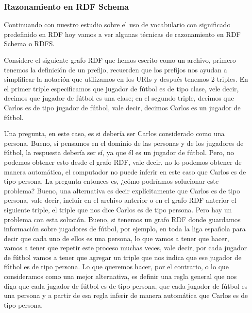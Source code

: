 \subsubsection{Razonamiento en RDF Schema}

Continuando con nuestro estudio sobre el uso de vocabulario con significado predefinido en RDF hoy vamos a ver algunas técnicas de razonamiento en RDF Schema o RDFS.

Considere el siguiente grafo RDF que hemos escrito como un archivo, primero tenemos la definición de un prefijo, recuerden que los prefijos nos ayudan a simplificar la notación que utilizamos en los URIs y después tenemos 2 triples. En el primer triple especificamos que jugador de fútbol es de tipo clase, vele decir, decimos que jugador de fútbol es una clase; en el segundo triple, decimos que Carlos es de tipo jugador de fútbol, vale decir, decimos Carlos es un jugador de fútbol.

Una pregunta, en este caso, es si debería ser Carlos considerado como una persona. Bueno, si pensamos en el dominio de las personas y de los jugadores de fútbol, la respuesta debería ser sí, ya que él es un jugador de fútbol. Pero, no podemos obtener esto desde el grafo RDF, vale decir, no lo podemos obtener de manera automática, el computador no puede inferir en este caso que Carlos es de tipo persona. La pregunta entonces es, ¿cómo podríamos solucionar este problema? Bueno, una alternativa es decir explícitamente que Carlos es de tipo persona, vale decir, incluir en el archivo anterior o en el grafo RDF anterior el siguiente triple, el triple que nos dice Carlos es de tipo persona. Pero hay un problema con esta solución. Bueno, si tenemos un grafo RDF donde guardamos información sobre jugadores de fútbol, por ejemplo, en toda la liga española para decir que cada uno de ellos es una persona, lo que vamos a tener que hacer, vamos a tener que repetir este proceso muchas veces, vale decir, por cada jugador de fútbol vamos a tener que agregar un triple que nos indica que ese jugador de fútbol es de tipo persona. Lo que queremos hacer, por el contrario, o lo que consideramos como una mejor alternativa, es definir una regla general que nos diga que cada jugador de fútbol es de tipo persona, que cada jugador de fútbol es una persona y a partir de esa regla inferir de manera automática que Carlos es de tipo persona.

